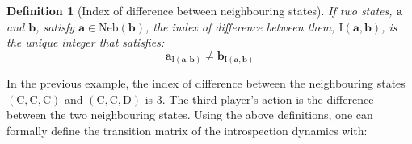 \documentclass[11pt]{article}
\theoremstyle{plainCl1}
\newtheorem{definition}{Definition}
\theoremstyle{plainCl2}
\newcommand{\abf}{\mathbf{a}}
\newcommand{\bbf}{\mathbf{b}}
\newcommand{\C}{\mathrm{C}}
\newcommand{\D}{\mathrm{D}}
\begin{document}
\begin{definition} [Index of difference between neighbouring states] If two states, $\abf$ and $\bbf$, satisfy $\abf \in \mathrm{Neb}(\bbf)$, the index of difference between them, $\mathrm{I}(\abf, \bbf)$, is the unique integer that satisfies:
\begin{equation}
\abf_{\mathrm{I}(\abf, \bbf)} \neq \bbf_{\mathrm{I}(\abf, \bbf)}
\end{equation} 
\label{Def:index-of-difference}
\end{definition} 
\noindent In the previous example, the index of difference between the neighbouring states $(\C,\C,\C)$ and $(\C,\C,\D)$ is $3$. The third player's action is the difference between the two neighbouring states. Using the above definitions, one can formally define the transition matrix of the introspection dynamics with:
\end{document}
